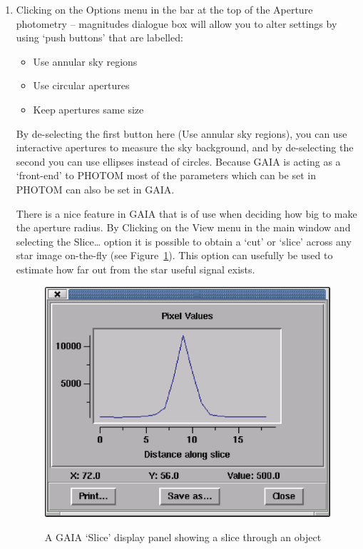 \documentclass[twoside,11pt]{article}
\renewcommand{\_}{\texttt{\symbol{95}}}
\begin{document}
\begin{enumerate}
  \item Clicking on the {\sf Options} menu in the bar at the top of the
   {\sf Aperture photometry -- magnitudes} dialogue box will allow you to
   alter settings by using `push buttons' that are labelled:

  \begin{itemize}

     \item {\sf Use annular sky regions}

     \item {\sf Use circular apertures}

     \item {\sf Keep apertures same size}

  \end{itemize}

   By de-selecting the first button here ({\sf Use annular sky
   regions}), you can use interactive apertures to measure the sky
   background, and by de-selecting the second you can use ellipses
   instead of circles.  Because GAIA is acting as a `front-end' to
   PHOTOM most of the parameters which can be set in PHOTOM can also
   be set in GAIA.

   There is a nice feature in GAIA that is of use when deciding how
   big to make the aperture radius. By Clicking on the {\sf View} menu
   in the main window and selecting the {\sf Slice\ldots} option it is
   possible to obtain a `cut' or `slice' across any star image on-the-fly
   (see Figure~\ref{PHOTOM_R_SLICE}).  This option can usefully be used to
   estimate how far out from the star useful signal exists.

  \begin{figure}[htbp]
     \centering
     \includegraphics[totalheight=3.25in]{sc17_photom_r_slice.ps}
     \begin{quote}
     \caption[A GAIA `{\sf Slice}' display panel]
      {A GAIA `{\sf Slice}' display panel showing a slice through an object
     \label{PHOTOM_R_SLICE} }
     \end{quote}
  \end{figure}


\end{enumerate}
\end{document}
